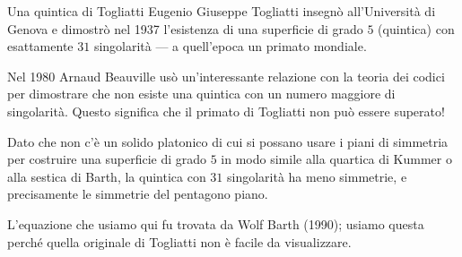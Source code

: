 \begin{surferPage}{Una quintica di Togliatti}
    Eugenio Giuseppe Togliatti insegn\`o all'Universit\`a di Genova e dimostr\`o nel 1937 l'esistenza di una superficie di grado $5$ (quintica) con esattamente $31$ singolarit\`a --- a quell'epoca un primato mondiale.

    Nel 1980 Arnaud Beauville us\`o un'interessante relazione con la teoria dei codici per dimostrare che non esiste una quintica con un numero maggiore di singolarit\`a. 
    Questo significa che il primato di Togliatti non pu\`o essere superato!

    Dato che non c'\`e un solido platonico di cui si possano usare i piani di simmetria per costruire una superficie di grado $5$ in modo simile alla  quartica di Kummer o alla sestica di Barth, la quintica con $31$ singolarit\`a ha meno simmetrie, e precisamente le simmetrie del pentagono piano.

 L'equazione che usiamo qui fu trovata da Wolf Barth (1990); usiamo questa perch\'e quella originale di Togliatti non \`e facile da visualizzare.
\end{surferPage}
